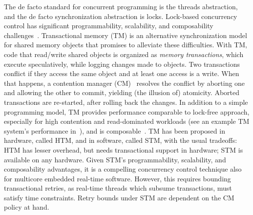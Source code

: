 \documentclass[conference]{IEEEtran}
\begin{document}
The de facto standard for concurrent programming is the threads abstraction, and the 
de facto synchronization abstraction is locks. Lock-based concurrency control has significant programmability, scalability, and composability challenges~\cite{Herlihy:2006:AMP:1146381.1146382}.
 Transactional memory (TM) is an alternative synchronization model for shared memory objects that promises to alleviate these difficulties. With TM, code that read/write shared objects is organized as \textit{memory transactions}, which execute speculatively, while logging changes made to objects. Two transactions conflict if they access the same object and at least one access is a write. When that happens, a contention manager (CM)~\cite{Guerraoui:2005:TTT:1073814.1073863} resolves the conflict by aborting one and allowing the other to commit, yielding (the illusion of) atomicity. Aborted transactions are re-started, after rolling back the changes. In addition to a simple programming model, TM provides performance comparable to lock-free approach, especially for high contention and read-dominated workloads (see an example TM system's performance in~\cite{Saha:2006:MHP:1122971.1123001}), and is composable~\cite{Harris:2005:CMT:1065944.1065952}. TM has been proposed in hardware, called HTM, and in software, called STM, with the usual tradeoffs: HTM has lesser overhead, but needs transactional support in hardware; STM is available on any hardware. Given STM's programmability, scalability, and composability advantages, it is a compelling concurrency control technique also for multicore embedded real-time software. However, this requires  bounding transactional  retries, as real-time threads which subsume transactions, must satisfy time constraints.  Retry bounds under STM are dependent on the CM policy at hand. 
\end{document}
